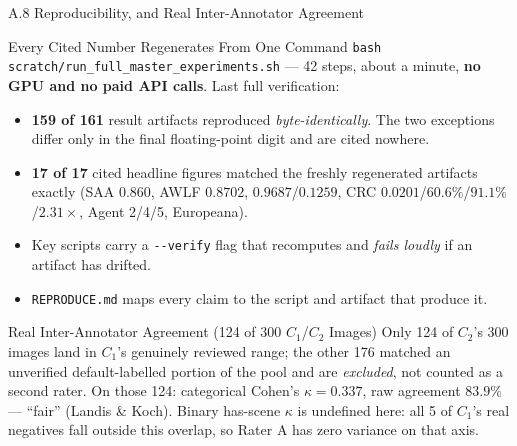 \documentclass[aspectratio=169,11pt]{beamer}
\begin{document}
\begin{frame}{A.8 Reproducibility, and Real Inter-Annotator Agreement}
\scriptsize
\begin{block}{Every Cited Number Regenerates From One Command}
\texttt{bash scratch/run\_full\_master\_experiments.sh} --- 42 steps, about a minute, \textbf{no GPU and no paid API calls}. Last full verification:
\begin{itemize}\scriptsize
  \item \textbf{159 of 161} result artifacts reproduced \emph{byte-identically}. The two exceptions differ only in the final floating-point digit and are cited nowhere.
  \item \textbf{17 of 17} cited headline figures matched the freshly regenerated artifacts exactly (SAA $0.860$, AWLF $0.8702$, $0.9687$/$0.1259$, CRC $0.0201$/$60.6\%$/$91.1\%$/$2.31\times$, Agent 2/4/5, Europeana).
  \item Key scripts carry a \texttt{-{}-verify} flag that recomputes and \emph{fails loudly} if an artifact has drifted.
  \item \texttt{REPRODUCE.md} maps every claim to the script and artifact that produce it.
\end{itemize}
\end{block}

\begin{block}{Real Inter-Annotator Agreement (124 of 300 $C_1$/$C_2$ Images)}
\scriptsize Only 124 of $C_2$'s 300 images land in $C_1$'s genuinely reviewed range; the other 176 matched an unverified default-labelled portion of the pool and are \emph{excluded}, not counted as a second rater. On those 124: categorical Cohen's $\kappa=\mathbf{0.337}$, raw agreement $\mathbf{83.9\%}$ --- ``fair'' (Landis \& Koch). Binary has-scene $\kappa$ is undefined here: all 5 of $C_1$'s real negatives fall outside this overlap, so Rater A has zero variance on that axis.
\end{block}
\end{frame}
\end{document}
